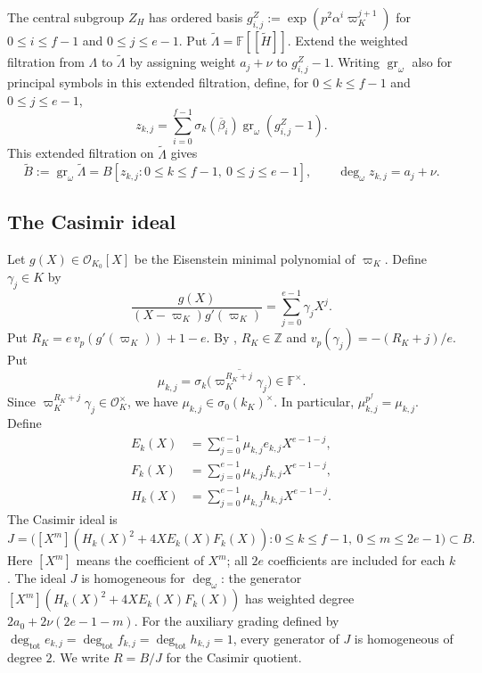 \documentclass[11pt]{article}
\numberwithin{equation}{section}
\theoremstyle{definition}
\theoremstyle{remark}
\newcommand{\F}{\mathbb F}
\newcommand{\Z}{\mathbb Z}
\newcommand{\cO}{\mathcal O}
\DeclareMathOperator{\gr}{gr}
\begin{document}
The central subgroup $Z_H$ has ordered basis
$g^Z_{i,j}:=\exp(p^2\alpha^i\varpi_K^{j+1})$
for $0\leq i\leq f-1$ and $0\leq j\leq e-1$.
Put $\widetilde\Lambda=\F[[\widetilde H]]$. Extend the weighted
filtration from $\Lambda$ to $\widetilde\Lambda$ by assigning
weight $a_j+\nu$ to
$g^Z_{i,j}-1$. Writing $\gr_\omega$ also for principal symbols
in this extended filtration, define, for $0\leq k\leq f-1$ and $0\leq j\leq e-1$,
\[
 z_{k,j}=\sum_{i=0}^{f-1}\sigma_k(\overline\beta_i)
    \gr_\omega(g^Z_{i,j}-1).
\]
This extended filtration on $\widetilde\Lambda$ gives
\[
 \widetilde B:=\gr_\omega\widetilde\Lambda
    =B[z_{k,j}:0\leq k\leq f-1,\ 0\leq j\leq e-1],\qquad
 \deg_\omega z_{k,j}=a_j+\nu.
\]

\subsection{The Casimir ideal}\label{subsec:casimir-ideal}

Let $g(X)\in\cO_{K_0}[X]$ be the Eisenstein minimal polynomial of
$\varpi_K$. Define $\gamma_j\in K$ by
\[
 \frac{g(X)}{(X-\varpi_K)g'(\varpi_K)}
       =\sum_{j=0}^{e-1}\gamma_jX^j.
\]
Put $R_K=e\,v_p(g'(\varpi_K))+1-e$. By
\cite[Lemma~6.2]{Sor26b}, $R_K\in\Z$ and
$v_p(\gamma_j)=-(R_K+j)/e$.
Put
\[
 \mu_{k,j}=\sigma_k\bigl(\overline{\varpi_K^{R_K+j}\gamma_j}\bigr)
          \in\F^\times.
\]
Since $\varpi_K^{R_K+j}\gamma_j\in\cO_K^\times$, we have
$\mu_{k,j}\in\sigma_0(k_K)^\times$. In particular,
$\mu_{k,j}^{p^f}=\mu_{k,j}$. Define
\begin{align*}
 E_k(X)&=\sum_{j=0}^{e-1}\mu_{k,j}e_{k,j}X^{e-1-j},\\
 F_k(X)&=\sum_{j=0}^{e-1}\mu_{k,j}f_{k,j}X^{e-1-j},\\
 H_k(X)&=\sum_{j=0}^{e-1}\mu_{k,j}h_{k,j}X^{e-1-j}.
\end{align*}
The Casimir ideal is
\begin{equation}\label{eq:general-casimir-ideal}
 J=
 \bigl([X^m](H_k(X)^2+4X E_k(X)F_k(X)):
           0\leq k\leq f-1,\ 0\leq m\leq 2e-1\bigr)\subset B.
\end{equation}
Here $[X^m]$ means the coefficient of $X^m$; all $2e$
coefficients are included for each $k$. The ideal $J$ is homogeneous
for $\deg_\omega$: the generator
$[X^m](H_k(X)^2+4X E_k(X)F_k(X))$ has weighted degree
$2a_0+2\nu(2e-1-m)$.
For the auxiliary grading defined by
$\deg_{\mathrm{tot}}e_{k,j}=\deg_{\mathrm{tot}}f_{k,j}=\deg_{\mathrm{tot}}h_{k,j}=1$,
every generator of $J$ is homogeneous of degree $2$.
We write $R=B/J$ for the Casimir quotient.
\end{document}
